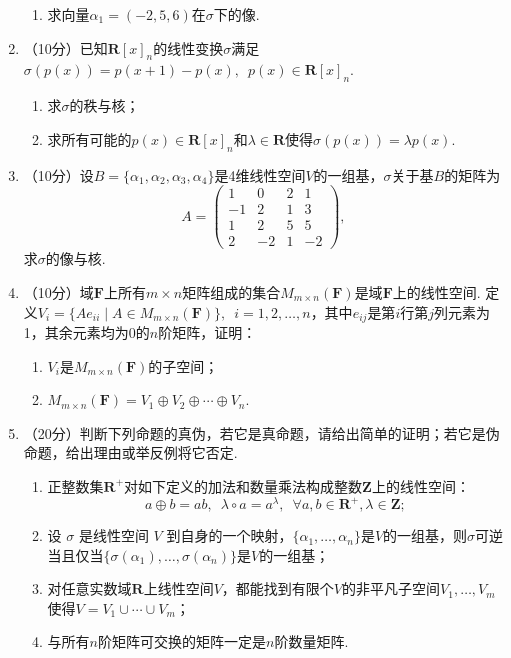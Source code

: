 \begin{enumerate}
\begin{enumerate}
        \item 求向量$\alpha_1=(-2,5,6)$在$\sigma$下的像.
    \end{enumerate}
	\item  （10分）已知$\mathbf{R}[x]_n$的线性变换$\sigma$满足$\sigma(p(x))=p(x+1)-p(x),\enspace p(x)\in\mathbf{R}[x]_n$.
	\begin{enumerate}
        \item 求$\sigma$的秩与核；

        \item 求所有可能的$p(x)\in\mathbf{R}[x]_n$和$\lambda\in\mathbf{R}$使得$\sigma(p(x))=\lambda p(x)$.
    \end{enumerate}
	\item （10分）设$B=\{\alpha_1,\alpha_2,\alpha_3,\alpha_4\}$是4维线性空间$V$的一组基，$\sigma$关于基$B$的矩阵为
    \[A=\begin{pmatrix}1 & 0 & 2 & 1 \\ -1 & 2 & 1 & 3 \\ 1 & 2 & 5 & 5 \\ 2 & -2 & 1 & -2\end{pmatrix},\]
    求$\sigma$的像与核.

    \item （10分）域$\mathbf{F}$上所有$m\times n$矩阵组成的集合$M_{m\times n}(\mathbf{F})$是域$\mathbf{F}$上的线性空间. 定义$V_i=\{Ae_{ii}\mid A\in M_{m\times n}(\mathbf{F})\}, \enspace i=1,2,\ldots,n$，其中$e_{ij}$是第$i$行第$j$列元素为1，其余元素均为0的$n$阶矩阵，证明：
    \begin{enumerate}
        \item $V_i$是$M_{m\times n}(\mathbf{F})$的子空间；

        \item $M_{m\times n}(\mathbf{F})=V_1\oplus V_2\oplus\cdots\oplus V_n$.
    \end{enumerate}
	\item （20分）判断下列命题的真伪，若它是真命题，请给出简单的证明；若它是伪命题，给出理由或举反例将它否定.
    \begin{enumerate}
        \item 正整数集$\mathbf{R}^+$对如下定义的加法和数量乘法构成整数$\mathbf{Z}$上的线性空间：
        \[a\oplus b=ab,\enspace\lambda\circ a=a^\lambda,\enspace\forall a,b\in\mathbf{R}^+,\lambda\in\mathbf{Z};\]

        \item 设 $\sigma$ 是线性空间 $V$ 到自身的一个映射，$\{\alpha_1,\ldots,\alpha_n\}$是$V$的一组基，则$\sigma$可逆当且仅当$\{\sigma(\alpha_1),\ldots,\sigma(\alpha_n)\}$是$V$的一组基；

        \item 对任意实数域$\mathbf{R}$上线性空间$V$，都能找到有限个$V$的非平凡子空间$V_1,\ldots,V_m$使得$V = V_1\cup\cdots\cup V_m$；

        \item 与所有$n$阶矩阵可交换的矩阵一定是$n$阶数量矩阵.
    \end{enumerate}
\end{enumerate}

\clearpage
